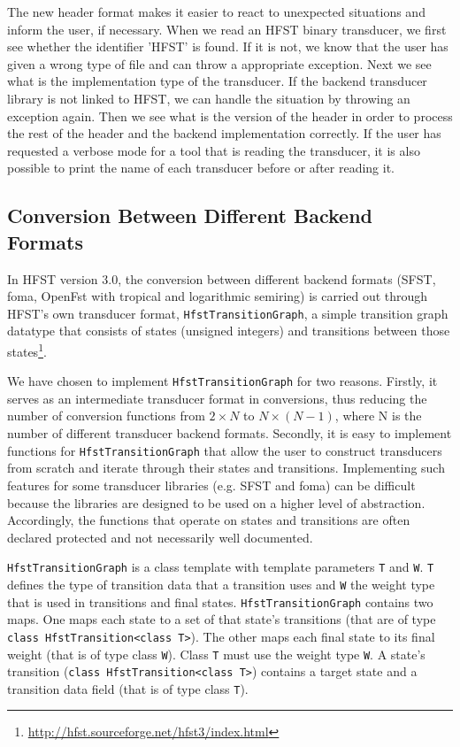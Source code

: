 \documentclass{llncs}
\begin{document}
The new header format makes it easier to react to unexpected
situations and inform the user, if necessary. When we read an HFST
binary transducer, we first see whether the identifier 'HFST' is
found. If it is not, we know that the user has given a wrong
type of file and can throw a appropriate exception. 
Next we see what is the implementation type of the transducer. 
If the backend transducer library is not linked to HFST, we can handle
the situation by throwing an exception again. 
Then we see what is the version of the header in order to process 
the rest of the header and the backend implementation correctly. 
If the user has requested a verbose mode for a tool that is reading the
transducer, it is also possible to print the name of each transducer 
before or after reading it.

\subsection{Conversion Between Different Backend Formats}

In HFST version 3.0, the conversion between different backend formats 
(SFST, foma, OpenFst with tropical and logarithmic semiring) is
carried out through HFST's own transducer format, \texttt{HfstTransitionGraph}, 
a simple transition graph datatype that consists of states (unsigned
integers) and transitions between those 
states\footnote{\url{http://hfst.sourceforge.net/hfst3/index.html}}.
 
We have chosen to implement \texttt{HfstTransitionGraph} for two
reasons. Firstly, it serves as an intermediate transducer format in
conversions, thus reducing the number of conversion functions from
$2 \times N$ to $N \times (N - 1)$, where N is the number of different
transducer backend formats. Secondly, it is easy to implement functions for 
\texttt{HfstTransitionGraph} that allow the user to construct transducers from 
scratch and iterate through their states and transitions. Implementing
such features for some transducer libraries (e.g. SFST and foma) can
be difficult because the libraries are designed to be used on a higher level of 
abstraction. Accordingly, the functions that operate on states and 
transitions are often declared protected and not necessarily well
documented.

\texttt{HfstTransitionGraph} is a class template with template parameters 
\texttt{T} and \texttt{W}. \texttt{T} defines the type of transition data
that a transition uses and \texttt{W}
the weight type that is used in transitions and final states. 
\texttt{HfstTransitionGraph} contains two maps. One maps each state to a set of
that state's transitions (that are of type 
\texttt{class HfstTransition\textless class T\textgreater}). 
The other maps each final state to its final weight 
(that is of type class \texttt{W}). Class \texttt{T} must use
the weight type \texttt{W}. 
A state's transition 
(\texttt{class HfstTransition\textless class T\textgreater}) 
contains a target state and a transition data field (that is of type class 
\texttt{T}).
\end{document}
